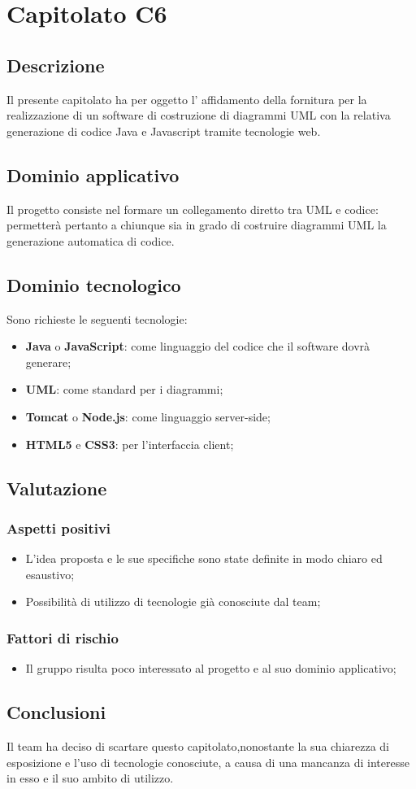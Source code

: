 \section {Capitolato C6}
	\subsection {Descrizione}
	Il presente capitolato ha per oggetto l’ affidamento della fornitura per la realizzazione
di un software di costruzione di diagrammi UML con la relativa generazione di codice
Java e Javascript tramite tecnologie web.
	\subsection {Dominio applicativo}
	Il progetto consiste nel formare un collegamento diretto tra UML e codice: permetterà pertanto a chiunque sia in grado di costruire diagrammi UML la generazione automatica di codice.
	\subsection {Dominio tecnologico}
	Sono richieste le seguenti tecnologie:
	\begin {itemize}
	\item \textbf{Java} o \textbf{JavaScript}: come linguaggio del codice che il software dovrà generare;
	\item \textbf{UML}: come standard per i diagrammi;
	\item \textbf{Tomcat} o \textbf{Node.js}: come linguaggio server-side;
	\item \textbf{HTML5} e \textbf{CSS3}: per l'interfaccia client;
	\end {itemize}
	\subsection {Valutazione}
		\subsubsection {Aspetti positivi}
			\begin {itemize}
			 	\item L'idea proposta e le sue specifiche sono state definite in modo chiaro ed esaustivo;
			 	\item Possibilità di utilizzo di tecnologie già conosciute dal team;
			\end {itemize}
		\subsubsection {Fattori di rischio}
			\begin {itemize}
				\item Il gruppo risulta poco interessato al progetto e al suo dominio applicativo;
			\end {itemize}
	\subsection {Conclusioni}
	Il team ha deciso di scartare questo capitolato,nonostante la sua chiarezza di esposizione e l'uso di tecnologie conosciute, a causa di una mancanza di interesse in esso e il suo ambito di utilizzo.